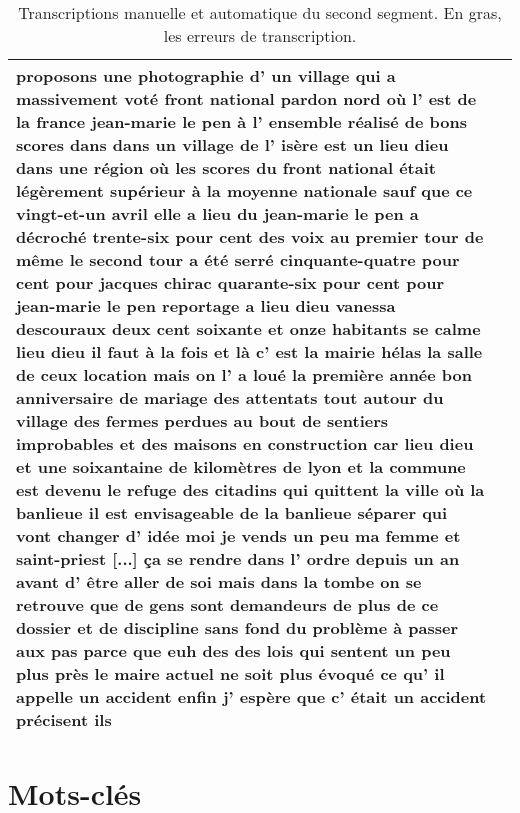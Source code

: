 \begin{table}[H]
\begin{center}
\begin{tabular}{|p{7.0cm}|p{7.2cm}|}
{proposons une photographie d' un village qui a massivement voté front national
\textbf{pardon} nord \textbf{où} l' est de la france jean-marie le pen
\textbf{à} l' ensemble réalisé de bons scores dans dans un village de l' isère
\textbf{est un lieu dieu} dans une région où les scores du front national
\textbf{était} légèrement \textbf{supérieur} à la moyenne nationale sauf que ce
vingt-et-un avril \textbf{elle a lieu du} jean-marie le pen a décroché
trente-six pour cent des voix au premier tour \textbf{de} même le second tour a
été serré cinquante-quatre pour cent pour jacques chirac quarante-six pour cent
pour jean-marie le pen reportage \textbf{a lieu dieu} vanessa descouraux deux
cent soixante et onze habitants \textbf{se} calme \textbf{lieu dieu} \textbf{il
faut à
la fois} et là c' est la mairie \textbf{hélas} la salle de \textbf{ceux}
location \textbf{mais} on l' a loué la première année \textbf{bon} anniversaire
de mariage des \textbf{attentats} tout autour du village des fermes perdues au
bout de sentiers improbables et des maisons en construction car \textbf{lieu
dieu et} une soixantaine de kilomètres de lyon et la commune est \textbf{devenu}
le refuge des citadins qui quittent la ville \textbf{où} la banlieue \textbf{il
est
envisageable} de la banlieue \textbf{séparer qui} vont changer d' \textbf{idée}
moi je \textbf{vends un peu} ma femme \textbf{et} saint-priest
[...]
\textbf{ça se rendre dans l'
ordre depuis un an avant d' être aller de soi mais dans la
tombe on se retrouve
que de} gens \textbf{sont demandeurs de} plus de \textbf{ce dossier et} de
discipline \textbf{sans fond du problème à passer aux pas parce que euh des} des
lois qui \textbf{sentent un} peu plus \textbf{près} le maire actuel ne
\textbf{soit} plus \textbf{évoqué} ce qu' il appelle un accident enfin j' espère
que c' était un accident \textbf{précisent ils}
}\\
\hline
\end{tabular}
\caption{Transcriptions manuelle et automatique du second segment. En gras,
les erreurs de transcription.}
\end{center}
\end{table}

\section{Mots-clés}
\label{sec:app_kw}

